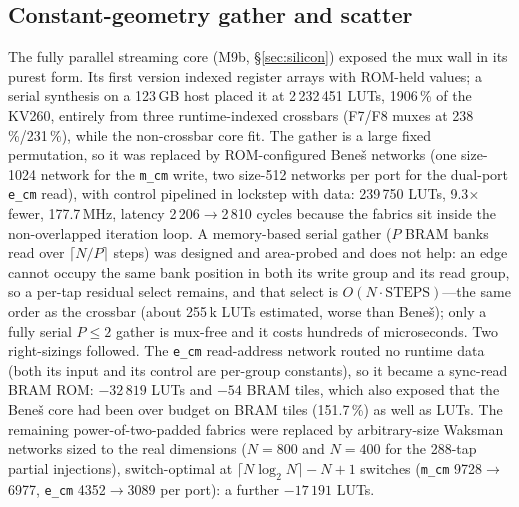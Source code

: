 \subsection*{Constant-geometry gather and scatter}
The fully parallel streaming core (M9b, \S\ref{sec:silicon}) exposed the
mux wall in its purest form. Its first version indexed register arrays with
ROM-held values; a serial synthesis on a 123\,GB host placed it at
2\,232\,451 LUTs, 1906\,\% of the KV260, entirely from three runtime-indexed
crossbars (F7/F8 muxes at 238\,\%/231\,\%), while the non-crossbar core fit.
The gather is a large fixed permutation, so it was replaced by
ROM-configured Bene\v{s} networks (one size-1024 network for the
\texttt{m\_cm} write, two size-512 networks per port for the dual-port
\texttt{e\_cm} read), with control pipelined in lockstep with data: 239\,750
LUTs, 9.3$\times$ fewer, 177.7\,MHz, latency 2\,206$\to$2\,810 cycles
because the fabrics sit inside the non-overlapped iteration loop.
A memory-based serial gather ($P$ BRAM banks read over $\lceil N/P\rceil$
steps) was designed and area-probed and does not help: an edge cannot occupy
the same bank position in both its write group and its read group, so a
per-tap residual select remains, and that select is $O(N\cdot\mathrm{STEPS})$---the
same order as the crossbar (about 255\,k LUTs estimated, worse than
Bene\v{s}); only a fully serial $P\le 2$ gather is mux-free and it costs
hundreds of microseconds.
Two right-sizings followed. The \texttt{e\_cm} read-address network routed
no runtime data (both its input and its control are per-group constants),
so it became a sync-read BRAM ROM: $-32\,819$ LUTs and $-54$ BRAM tiles,
which also exposed that the Bene\v{s} core had been over budget on BRAM
tiles (151.7\,\%) as well as LUTs.
The remaining power-of-two-padded fabrics were replaced by arbitrary-size
Waksman networks \citep{waksman1968permutation,beauquier2002aswaksman} sized to the real dimensions ($N=800$ and $N=400$ for the
288-tap partial injections), switch-optimal at
$\lceil N\log_2 N\rceil-N+1$ switches (\texttt{m\_cm} 9728$\to$6977,
\texttt{e\_cm} 4352$\to$3089 per port): a further $-17\,191$ LUTs.
